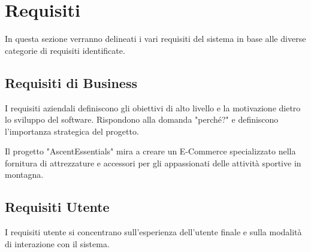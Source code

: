 
\chapter{Requisiti}

In questa sezione verranno delineati i vari requisiti del sistema in base alle diverse categorie di requisiti identificate.

\section{Requisiti di Business}
I requisiti aziendali definiscono gli obiettivi di alto livello e la motivazione dietro lo sviluppo del software. Rispondono alla domanda "perché?" e definiscono l'importanza strategica del progetto.

Il progetto "AscentEssentials" mira a creare un E-Commerce specializzato nella fornitura di attrezzature e accessori per gli appassionati delle attività sportive in montagna.

\section{Requisiti Utente}
I requisiti utente si concentrano sull'esperienza dell'utente finale e sulla modalità di interazione con il sistema.

